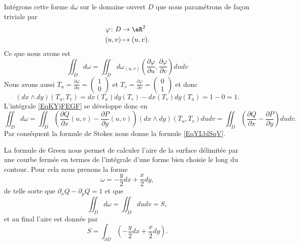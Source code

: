 Intégrons cette forme \( d\omega\) sur le domaine ouvert \( D\) que nous paramétrons de façon triviale par
\begin{equation}
	\begin{aligned}
		\varphi\colon D & \to \eR^2      \\
		(u,v)           & \mapsto (u,v).
	\end{aligned}
\end{equation}
Ce que nous avons est
\begin{equation}\label{EqKYjFEGF}
	\iint_D d\omega=\iint_D d\omega_{(u,v)}\left( \frac{ \partial \varphi }{ \partial u },\frac{ \partial \varphi }{ \partial v } \right)dudv
\end{equation}
Nous avons aussi \( T_u=\frac{ \partial \varphi }{ \partial u }=\begin{pmatrix}
	1 \\
	0
\end{pmatrix}\) et \(T_v= \frac{ \partial \varphi }{ \partial v }=\begin{pmatrix}
	0 \\
	1
\end{pmatrix}\) et donc
\begin{equation}
	(dx\wedge dy)(T_u,T_v)=dx(T_u)dy(T_v)-dx(T_v)dy(T_u)=1-0=1.
\end{equation}
L'intégrale \eqref{EqKYjFEGF} se développe donc en
\begin{equation}
	\iint_Dd\omega=\iint_D\left( \frac{ \partial Q }{ \partial x }(u,v)-\frac{ \partial P }{ \partial y }(u,v) \right)(dx\wedge dy)(T_u,T_v)dudv=\iint_D\left( \frac{ \partial Q }{ \partial x }-\frac{ \partial P }{ \partial y } \right)dudv.
\end{equation}
Par conséquent la formule de Stokes nous donne la formule \eqref{EqYLblSqV}.

La formule de Green nous permet de calculer l'aire de la surface délimitée par une courbe fermée en termes de l'intégrale d'une forme bien choisie le long du contour. Pour cela nous prenons la forme
\begin{equation}    \label{EqZNXYMQb}
	\omega=-\frac{ y }{2}dx+\frac{ x }{2}dy,
\end{equation}
de telle sorte que \( \partial_xQ-\partial_yQ=1\) et que
\begin{equation}
	\iint_Dd\omega=\iint_Ddudv=S,
\end{equation}
et au final l'aire est donnée par
\begin{equation}
	S=\int_{\partial D}\left( -\frac{ y }{2}dx+\frac{ x }{2}dy \right).
\end{equation}


